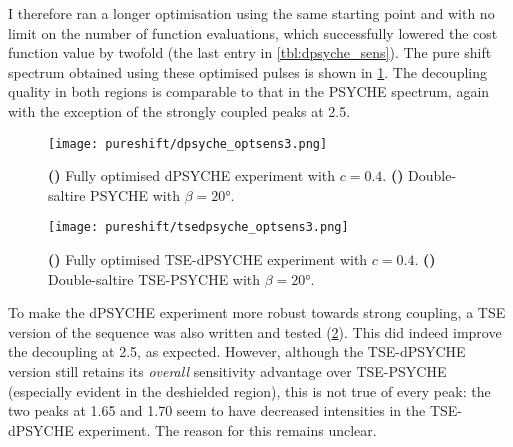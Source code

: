 I therefore ran a longer optimisation using the same starting point and with no limit on the number of function evaluations, which successfully lowered the cost function value by twofold (the last entry in \cref{tbl:dpsyche_sens}).
The pure shift spectrum obtained using these optimised pulses is shown in \cref{fig:dpsyche_optsens3}.
The decoupling quality in both regions is comparable to that in the PSYCHE spectrum, again with the exception of the strongly coupled peaks at \qty{2.5}{\ppm}.

\begin{figure}[htb]
    \centering
    \texttt{[image: pureshift/dpsyche\_optsens3.png]}%
    {\label{fig:dpsyche_optsens3_d}}%
    {\label{fig:dpsyche_optsens3_p}}%
    \caption[dPSYCHE final optimisation with $c = 0.4$]{
        \textbf{()} Fully optimised dPSYCHE experiment with $c = 0.4$.
        \textbf{()} Double-saltire PSYCHE with $\beta = \ang{20}$.
    }
    \label{fig:dpsyche_optsens3}
\end{figure}

\begin{figure}[htb]
    \centering
    \texttt{[image: pureshift/tsedpsyche\_optsens3.png]}%
    {\label{fig:tsedpsyche_optsens3_d}}%
    {\label{fig:tsedpsyche_optsens3_p}}%
    \caption[TSE-dPSYCHE final optimisation with $c = 0.4$]{
        \textbf{()} Fully optimised TSE-dPSYCHE experiment with $c = 0.4$.
        \textbf{()} Double-saltire TSE-PSYCHE with $\beta = \ang{20}$.
    }
    \label{fig:tsedpsyche_optsens3}
\end{figure}

To make the dPSYCHE experiment more robust towards strong coupling, a TSE version of the sequence was also written and tested (\cref{fig:tsedpsyche_optsens3}).
This did indeed improve the decoupling at \qty{2.5}{\ppm}, as expected.
However, although the TSE-dPSYCHE version still retains its \textit{overall} sensitivity advantage over TSE-PSYCHE (especially evident in the deshielded region), this is not true of every peak: the two peaks at 1.65 and \qty{1.70}{\ppm} seem to have decreased intensities in the TSE-dPSYCHE experiment.
The reason for this remains unclear.

